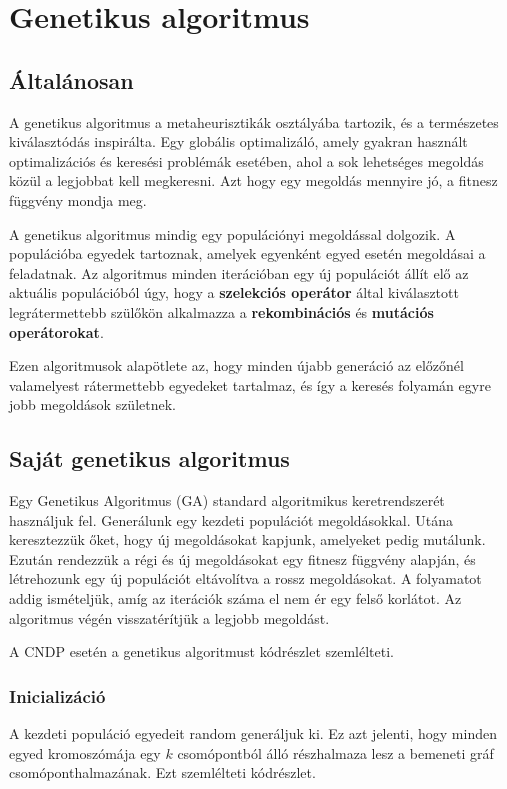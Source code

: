 \section{Genetikus algoritmus}\label{sec:GENETIKUS_ALGORITMUS}


\subsection{Általánosan}
A genetikus algoritmus a metaheurisztikák osztályába tartozik, és a természetes kiválasztódás inspirálta.
Egy globális optimalizáló, amely gyakran használt optimalizációs és keresési problémák esetében,
ahol a sok lehetséges megoldás közül a legjobbat kell megkeresni.
Azt hogy egy megoldás mennyire jó, a fitnesz függvény mondja meg.

A genetikus algoritmus mindig egy populációnyi megoldással dolgozik.
A populációba egyedek tartoznak, amelyek egyenként  egyed esetén megoldásai a feladatnak.
Az algoritmus minden iterációban egy új populációt állít elő az aktuális populációból úgy,
hogy a \textbf{szelekciós operátor} által kiválasztott legrátermettebb szülőkön alkalmazza a
\textbf{rekombinációs} és \textbf{mutációs operátorokat}.

Ezen algoritmusok alapötlete az, hogy minden újabb generáció
az előzőnél valamelyest rátermettebb egyedeket tartalmaz, és így a keresés folyamán
egyre jobb megoldások születnek.


\subsection{Saját genetikus algoritmus}
Egy Genetikus Algoritmus (GA) standard algoritmikus keretrendszerét használjuk fel.
Generálunk egy kezdeti populációt megoldásokkal. Utána keresztezzük őket, hogy új megoldásokat kapjunk,
amelyeket pedig mutálunk. Ezután rendezzük a régi és új megoldásokat egy fitnesz függvény alapján,
és létrehozunk egy új populációt eltávolítva a rossz megoldásokat.
A folyamatot addig ismételjük, amíg az iterációk száma el nem ér egy felső korlátot.
Az algoritmus végén visszatérítjük a legjobb megoldást.

A CNDP esetén a genetikus algoritmust  kódrészlet szemlélteti.



\subsubsection{Inicializáció}
A kezdeti populáció egyedeit random generáljuk ki.
Ez azt jelenti, hogy minden egyed kromoszómája egy $k$ csomópontból álló részhalmaza lesz a bemeneti gráf csomóponthalmazának.
Ezt szemlélteti  kódrészlet.


